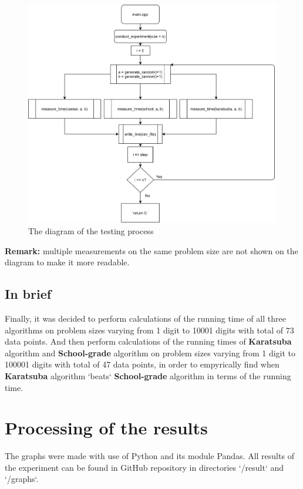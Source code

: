 \documentclass[12pt, oneside]{article}
\begin{document}
   \begin{figure}[h]
\caption{The diagram of the testing process}
\centering
\includegraphics[width=1.15\textwidth]{ExperimentFlow}
\end{figure}
\textbf{Remark:} multiple measurements on the same problem size are not shown on the diagram to make it more readable.

\subsection{In brief}
Finally, it was decided to perform calculations of the running time of all three algorithms on problem sizes varying from 1 digit to 10001 digits with total of 73 data points. And then perform calculations of the running times of \textbf{Karatsuba} algorithm and \textbf{School-grade} algorithm on problem sizes varying from 1 digit to 100001 digits with total of 47 data points, in order to empyrically find when \textbf{Karatsuba} algorithm `beats` \textbf{School-grade} algorithm in terms of the running time.
\clearpage
\section{Processing of the results}

The graphs were made with use of Python and its module Pandas. All results of the experiment can be found in GitHub repository in directories `/result` and `/graphs`.
\end{document}
